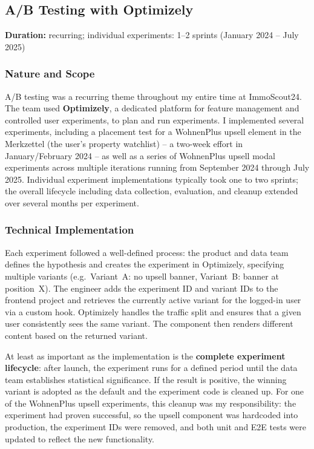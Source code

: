 \documentclass[a4paper, 12pt]{article}
\begin{document}
\subsection{A/B Testing with Optimizely}

\noindent\textbf{Duration:} recurring; individual experiments: 1--2 sprints (January 2024 -- July 2025)

\subsubsection*{Nature and Scope}

A/B testing was a recurring theme throughout my entire time at ImmoScout24. The team
used \textbf{Optimizely}, a dedicated platform for feature management and controlled
user experiments, to plan and run experiments. I implemented several experiments,
including a placement test for a WohnenPlus upsell element in the Merkzettel (the
user's property watchlist) -- a two-week effort in January/February 2024 -- as well
as a series of WohnenPlus upsell modal experiments across multiple iterations running
from September 2024 through July 2025. Individual experiment implementations typically
took one to two sprints; the overall lifecycle including data collection, evaluation,
and cleanup extended over several months per experiment.

\subsubsection*{Technical Implementation}

Each experiment followed a well-defined process: the product and data team defines the
hypothesis and creates the experiment in Optimizely, specifying multiple variants
(e.g.\ Variant~A: no upsell banner, Variant~B: banner at position~X). The engineer
adds the experiment ID and variant IDs to the frontend project and retrieves the
currently active variant for the logged-in user via a custom hook. Optimizely handles
the traffic split and ensures that a given user consistently sees the same variant. The
component then renders different content based on the returned variant.

At least as important as the implementation is the \textbf{complete experiment
lifecycle}: after launch, the experiment runs for a defined period until the data team
establishes statistical significance. If the result is positive, the winning variant is
adopted as the default and the experiment code is cleaned up. For one of the WohnenPlus
upsell experiments, this cleanup was my responsibility: the experiment had proven
successful, so the upsell component was hardcoded into production, the experiment IDs
were removed, and both unit and E2E tests were updated to reflect the new functionality.
\end{document}
